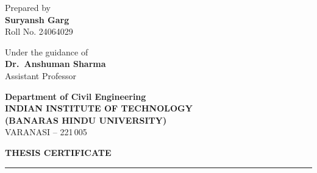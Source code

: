 \documentclass[12pt,a4paper,oneside]{report}
\begin{document}
\begin{titlepage}
\begin{center}
    \begin{minipage}[t]{0.45\textwidth}
        \begin{flushleft}
            {\fontsize{14}{16}\selectfont\sffamily\color{LightSlate} Prepared by}\\[0.4cm]
            {\color{PrimaryNavy}\fontsize{18}{22}\selectfont\sffamily\bfseries Suryansh Garg}\\[0.1cm]
            {\fontsize{12}{14}\selectfont\sffamily Roll No. 24064029}
        \end{flushleft}
    \end{minipage}
    \hfill
    \begin{minipage}[t]{0.45\textwidth}
        \begin{flushright}
            {\fontsize{14}{16}\selectfont\sffamily\color{LightSlate} Under the guidance of}\\[0.3cm]
            {\color{PrimaryNavy}\fontsize{16}{20}\selectfont\sffamily\bfseries Dr.\ Anshuman Sharma}\\[0.1cm]
            {\fontsize{14}{16}\selectfont\sffamily Assistant Professor}
        \end{flushright}
    \end{minipage}
    
    \vfill 
    
    {\color{PrimaryNavy}\fontsize{14}{16}\selectfont\sffamily\bfseries Department of Civil Engineering}\\[0.2cm]
    {\color{PrimaryNavy}\fontsize{16}{20}\selectfont\sffamily\bfseries INDIAN INSTITUTE OF TECHNOLOGY}\\[0.1cm]
    {\color{PrimaryNavy}\fontsize{16}{20}\selectfont\sffamily\bfseries (BANARAS HINDU UNIVERSITY)}\\[0.2cm]
    {\fontsize{14}{16}\selectfont\sffamily VARANASI -- 221\,005}\\[0.5cm]
\end{center}
\end{titlepage}

\newpage
\thispagestyle{empty}

\begin{center}
    {\color{PrimaryNavy}\fontsize{20}{24}\selectfont\bfseries THESIS CERTIFICATE}\\[4pt]
    {\color{AccentTeal}\rule{4cm}{2pt}}
\end{center}
\vspace{0.8cm}
\end{document}
